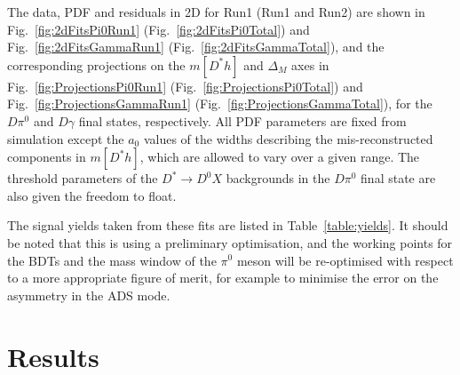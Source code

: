 \documentclass[oneside,12pt]{article}
\begin{document}
The data, PDF and residuals in 2D for Run1 (Run1 and Run2) are shown in
Fig.~\ref{fig:2dFitsPi0Run1} (Fig.~\ref{fig:2dFitsPi0Total}) and
Fig.~\ref{fig:2dFitsGammaRun1} (Fig.~\ref{fig:2dFitsGammaTotal}), and the
corresponding projections on the $m[D^*h]$ and $\Delta_M$ axes in
Fig.~\ref{fig:ProjectionsPi0Run1} (Fig.~\ref{fig:ProjectionsPi0Total}) and
Fig.~\ref{fig:ProjectionsGammaRun1} (Fig.~\ref{fig:ProjectionsGammaTotal}), for
the $D\pi^0$ and $D\gamma$ final states, respectively. All PDF parameters are
fixed from simulation except the $a_0$ values of the widths describing the
mis-reconstructed components in $m[D^{*}h]$, which are allowed to vary over a
given range. The threshold parameters of the $D^{*}\rightarrow D^0X$
backgrounds in the $D\pi^0$ final state are also given the freedom to float.

The signal yields taken from these fits are listed in Table~\ref{table:yields}.
It should be noted that this is using a preliminary optimisation, and the
working points for the BDTs and the mass window of the $\pi^0$ meson will be
re-optimised with respect to a more appropriate figure of merit, for example to
minimise the error on the asymmetry in the ADS mode.

\section{Results} \label{sec:results}
\begin{table}[]
 \caption{\small{Signal yields and errors extracted from the 2D fit results for Run1, then Run1 and
Run2 data.}} \label{table:yields}
\end{table}
\end{document}
